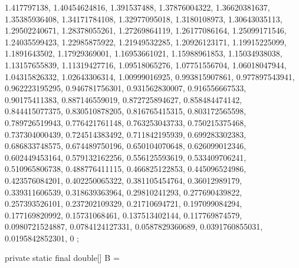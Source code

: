 \begin{code}
\begin{hide}
{       1.417797138,     1.40454624816,       1.391537488,
     1.37876004322,     1.36620381637,     1.35385936408,
     1.34171784108,     1.32977095018,      1.3180108973,
     1.30643035113,     1.29502240671,     1.28378055261,
     1.27269864119,     1.26177086164,     1.25099171546,
     1.24035599423,     1.22985875922,     1.21949532285,
     1.20926123171,     1.19915225099,      1.1891643502,
     1.17929369001,     1.16953661021,     1.15988961853,
     1.15034938038,     1.13157655839,     1.11319427716,
     1.09518065276,     1.07751556704,     1.06018047944,
     1.04315826332,     1.02643306314,     1.00999016925,
    0.993815907861,    0.977897543941,    0.962223195295,
    0.946781756301,    0.931562830007,    0.916556667533,
     0.90175411383,    0.887146559019,    0.872725894627,
    0.858484474142,    0.844415077375,    0.830510878205,
    0.816765415315,    0.803172565598,    0.789726519943,
    0.776421761148,    0.763253043733,    0.750215375468,
    0.737304000439,    0.724514383492,    0.711842195939,
    0.699283302383,    0.686833748575,    0.674489750196,
    0.650104070648,    0.626099012346,    0.602449453164,
    0.579132162256,    0.556125593619,    0.533409706241,
    0.510965806738,    0.488776411115,    0.466825122853,
    0.445096524986,    0.423576084201,    0.402250065322,
    0.381105454764,     0.36012989179,    0.339311606539,
    0.318639363964,     0.29810241293,    0.277690439822,
    0.257393526101,    0.237202109329,     0.21710694721,
    0.197099084294,    0.177169820992,     0.15731068461,
    0.137513402144,    0.117769874579,   0.0980721524887,
   0.0784124127331,   0.0587829360689,   0.0391760855031,
   0.0195842852301,                 0
   };

    private static final double[] B = {
 
}
\end{hide}
\end{code}
